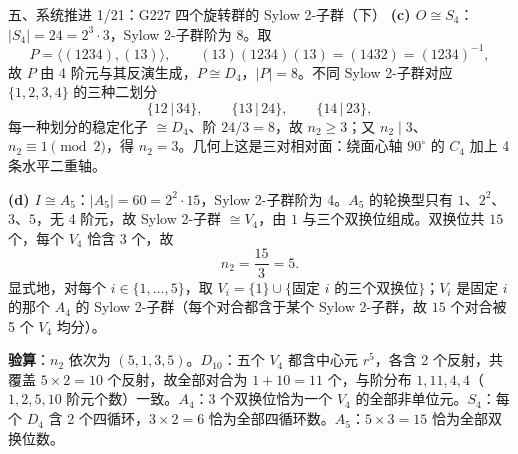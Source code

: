 \documentclass[aspectratio=169,10pt,fontset=none]{ctexbeamer}
\newcommand{\key}[1]{\textcolor{ink}{\bfseries #1}}
\begin{document}
\begin{frame}[t]{五、系统推进 1/21：G227 四个旋转群的 Sylow 2-子群（下）}
\scriptsize
\key{(c) $O\cong S_4$}：$|S_4|=24=2^3\cdot3$，Sylow 2-子群阶为 8。取
\[ P=\langle(1234),(13)\rangle,\qquad (13)(1234)(13)=(1432)=(1234)^{-1}, \]
故 $P$ 由 4 阶元与其反演生成，$P\cong D_4$，$|P|=8$。不同 Sylow 2-子群对应 $\{1,2,3,4\}$ 的三种二划分
\[ \{12\,|\,34\},\qquad\{13\,|\,24\},\qquad\{14\,|\,23\}, \]
每一种划分的稳定化子 $\cong D_4$、阶 $24/3=8$，故 $n_2\ge3$；又 $n_2\mid3$、$n_2\equiv1\pmod2$，得 $n_2=3$。几何上这是三对相对面：绕面心轴 $90^\circ$ 的 $C_4$ 加上 4 条水平二重轴。

\key{(d) $I\cong A_5$}：$|A_5|=60=2^2\cdot15$，Sylow 2-子群阶为 4。$A_5$ 的轮换型只有 $1$、$2^2$、$3$、$5$，无 4 阶元，故 Sylow 2-子群 $\cong V_4$，由 $1$ 与三个双换位组成。双换位共 $15$ 个，每个 $V_4$ 恰含 3 个，故
\[ n_2=\frac{15}{3}=5. \]
显式地，对每个 $i\in\{1,\dots,5\}$，取 $V_i=\{1\}\cup\{\text{固定 }i\text{ 的三个双换位}\}$；$V_i$ 是固定 $i$ 的那个 $A_4$ 的 Sylow 2-子群（每个对合都含于某个 Sylow 2-子群，故 $15$ 个对合被 5 个 $V_4$ 均分）。

\key{验算}：$n_2$ 依次为 $(5,1,3,5)$。$D_{10}$：五个 $V_4$ 都含中心元 $r^5$，各含 2 个反射，共覆盖 $5\times2=10$ 个反射，故全部对合为 $1+10=11$ 个，与阶分布 $1,11,4,4$（$1,2,5,10$ 阶元个数）一致。$A_4$：3 个双换位恰为一个 $V_4$ 的全部非单位元。$S_4$：每个 $D_4$ 含 2 个四循环，$3\times2=6$ 恰为全部四循环数。$A_5$：$5\times3=15$ 恰为全部双换位数。
\end{frame}
\end{document}

